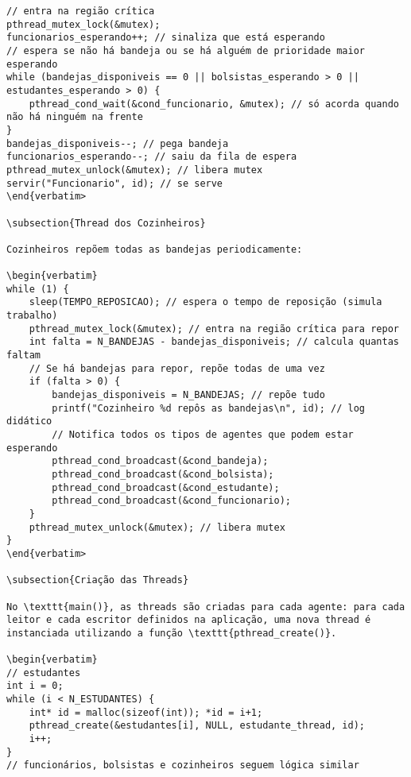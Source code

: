 \documentclass[10pt,a4paper]{article}
\begin{document}
\begin{verbatim}
// entra na região crítica
pthread_mutex_lock(&mutex);
funcionarios_esperando++; // sinaliza que está esperando
// espera se não há bandeja ou se há alguém de prioridade maior esperando
while (bandejas_disponiveis == 0 || bolsistas_esperando > 0 || estudantes_esperando > 0) {
    pthread_cond_wait(&cond_funcionario, &mutex); // só acorda quando não há ninguém na frente
}
bandejas_disponiveis--; // pega bandeja
funcionarios_esperando--; // saiu da fila de espera
pthread_mutex_unlock(&mutex); // libera mutex
servir("Funcionario", id); // se serve
\end{verbatim>

\subsection{Thread dos Cozinheiros}

Cozinheiros repõem todas as bandejas periodicamente:

\begin{verbatim}
while (1) {
    sleep(TEMPO_REPOSICAO); // espera o tempo de reposição (simula trabalho)
    pthread_mutex_lock(&mutex); // entra na região crítica para repor
    int falta = N_BANDEJAS - bandejas_disponiveis; // calcula quantas faltam
    // Se há bandejas para repor, repõe todas de uma vez
    if (falta > 0) {
        bandejas_disponiveis = N_BANDEJAS; // repõe tudo
        printf("Cozinheiro %d repôs as bandejas\n", id); // log didático
        // Notifica todos os tipos de agentes que podem estar esperando
        pthread_cond_broadcast(&cond_bandeja);
        pthread_cond_broadcast(&cond_bolsista);
        pthread_cond_broadcast(&cond_estudante);
        pthread_cond_broadcast(&cond_funcionario);
    }
    pthread_mutex_unlock(&mutex); // libera mutex
}
\end{verbatim>

\subsection{Criação das Threads}

No \texttt{main()}, as threads são criadas para cada agente: para cada leitor e cada escritor definidos na aplicação, uma nova thread é instanciada utilizando a função \texttt{pthread_create()}. 

\begin{verbatim}
// estudantes
int i = 0;
while (i < N_ESTUDANTES) {
    int* id = malloc(sizeof(int)); *id = i+1;
    pthread_create(&estudantes[i], NULL, estudante_thread, id);
    i++;
}
// funcionários, bolsistas e cozinheiros seguem lógica similar
\end{verbatim}
\end{document}
